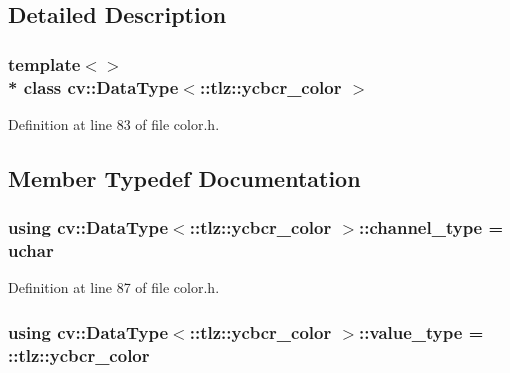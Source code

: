\subsection{Detailed Description}
\subsubsection*{template$<$$>$\\*
class cv\+::\+Data\+Type$<$\+::tlz\+::ycbcr\+\_\+color $>$}



Definition at line 83 of file color.\+h.



\subsection{Member Typedef Documentation}
\subsubsection[{\texorpdfstring{channel\+\_\+type}{channel_type}}]{\setlength{\rightskip}{0pt plus 5cm}using cv\+::\+Data\+Type$<$\+::{\bf tlz\+::ycbcr\+\_\+color} $>$\+::{\bf channel\+\_\+type} =  uchar}\hypertarget{classcv_1_1DataType_3_1_1tlz_1_1ycbcr__color_01_4_a7b511339ed019747cd930895e66482ff}{}\label{classcv_1_1DataType_3_1_1tlz_1_1ycbcr__color_01_4_a7b511339ed019747cd930895e66482ff}


Definition at line 87 of file color.\+h.

\subsubsection[{\texorpdfstring{value\+\_\+type}{value_type}}]{\setlength{\rightskip}{0pt plus 5cm}using cv\+::\+Data\+Type$<$\+::{\bf tlz\+::ycbcr\+\_\+color} $>$\+::{\bf value\+\_\+type} =  \+::{\bf tlz\+::ycbcr\+\_\+color}}\hypertarget{classcv_1_1DataType_3_1_1tlz_1_1ycbcr__color_01_4_a91e3dba856d7a0c7b6646817ccaff4f2}{}\label{classcv_1_1DataType_3_1_1tlz_1_1ycbcr__color_01_4_a91e3dba856d7a0c7b6646817ccaff4f2}


